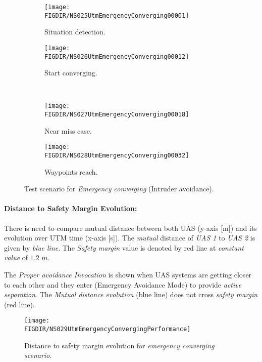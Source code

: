 \begin{figure}[H]
    \centering
    \begin{subfigure}{0.48\textwidth}
    	\centering
        \texttt{[image: \\FIGDIR/NS025UtmEmergencyConverging00001]}
        \caption{Situation detection.}
        \label{fig:emergencyConvergingSituationDetection}
    \end{subfigure}
    \begin{subfigure}{0.48\textwidth}
    	\centering
        \texttt{[image: \\FIGDIR/NS026UtmEmergencyConverging00012]} 
        \caption{Start converging.}
        \label{fig:emergencyConvergingStart}
    \end{subfigure}
    \\
    \begin{subfigure}{0.48\textwidth}
    	\centering
        \texttt{[image: \\FIGDIR/NS027UtmEmergencyConverging00018]} 
        \caption{Near miss case.}
        \label{fig:emergencyConvergingEnd}
    \end{subfigure}
    \begin{subfigure}{0.48\textwidth}
    	\centering
        \texttt{[image: \\FIGDIR/NS028UtmEmergencyConverging00032]} 
        \caption{Waypoints reach.}
        \label{fig:emergencyConvergingWaypointReach}
    \end{subfigure}
    \caption{Test scenario for \emph{Emergency converging} (Intruder avoidance). }
    \label{fig:testCaseEmergencyConverging}
\end{figure}


\paragraph{Distance to Safety Margin Evolution:} There is need to compare mutual distance between both UAS (y-axis [m]) and its evolution over UTM time (x-axis [s]). The \emph{mutual} distance of \emph{UAS 1} to \emph{UAS 2} is given by \emph{blue line}. The \emph{Safety margin} value is denoted by red line at \emph{constant value} of $1.2$ $m$.

The \emph{Proper avoidance Invocation} is shown when UAS systems are getting closer to each other and they enter (Emergency Avoidance Mode) to provide \emph{active separation}. The \emph{Mutual distance evolution} (blue line) does not cross \emph{safety margin} (red line).

\begin{figure}[H]
    \centering
    \texttt{[image: \\FIGDIR/NS029UtmEmergencyConvergingPerformance]} 
    \caption{Distance to safety margin evolution for \emph{emergency converging scenario}.}
    \label{fig:testCaseEmergencyConvergingAvoidancePerformance}
\end{figure}

